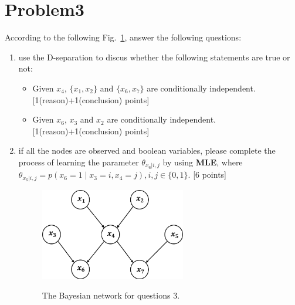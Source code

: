 \documentclass[10pt]{article}
\begin{document}
\section{Problem3}
According to the following Fig.~\ref{fig2}, answer the following questions:
\begin{enumerate}
    \item[(a)]
    use the D-separation to discus whether the following statements are true or not: 
    \begin{itemize}
        \item[(1)] Given $x_4$, $ \{x_1, x_2\} $ and $ \{x_6, x_7\} $ are conditionally independent.{\color{red} [1(reason)+1(conclusion) points]}
        
		\item[(2)] Given $x_6$, $ x_3 $ and $ x_2 $ are conditionally independent.{\color{red} [1(reason)+1(conclusion) points]}
    \end{itemize}

	\item[(b)] if all the nodes are observed and boolean variables, please complete the process of learning the parameter $ \theta_{x_6|i,j} $ by using \textbf{MLE}, where $ \theta_{x_6|i,j} = p(x_6 = 1\mid x_3 = i, x_4 = j), i,j \in \{ 0, 1\}$.{\color{red} [6 points]}
	
	\begin{figure}[h!] 
		\centering
		\includegraphics[width=2.5in]{3.png}
		\label{fig2}
		\caption{The Bayesian network for questions $3$.}
	\end{figure}
\end{enumerate}
\end{document}
